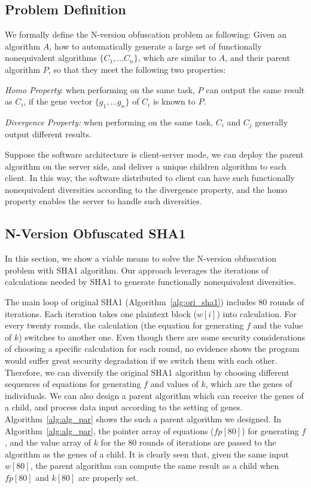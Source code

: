 \documentclass[10pt, conference]{IEEEtran}
\begin{document}
\subsection{Problem Definition}
We formally define the N-version obfuscation problem as following: Given an algorithm $A$, how to automatically generate a large set of functionally nonequivalent algorithms $\{C_1,...C_n\}$, which are similar to $A$, and their parent algorithm $P$, so that they meet the following two properties:

\textit{Homo Property}: when performing on the same task, $P$ can output the same result as $C_i$, if the gene vector $\{g_1,...g_n\}$ of $C_i$ is known to $P$.  

\textit{Divergence Property:} when performing on the same task, $C_i$ and $C_j$ generally output different results. 

Suppose the software architecture is client-server mode, we can deploy the parent algorithm on the server side, and deliver a unique children algorithm to each client.  In this way, the software distributed to client can have such functionally nonequivalent diversities according to the divergence property, and the homo property enables the server to handle such diversities.

\subsection{N-Version Obfuscated SHA1}

In this section, we show a viable means to solve the N-version obfuscation problem with SHA1 algorithm.  Our approach leverages the iterations of calculations needed by SHA1 to generate functionally nonequivalent diversities.

The main loop of original SHA1 (Algorithm~\ref{alg:ori_sha1}) includes 80 rounds of iterations.  Each iteration takes one plaintext block ($w[i]$) into calculation.  For every twenty rounds, the calculation (the equation for generating $f$ and the value of $k$) switches to another one.  Even though there are some security considerations of choosing a specific calculation for each round, no evidence shows the program would suffer great security degradation if we switch them with each other.  Therefore, we can diversify the original SHA1 algorithm by choosing different sequences of equations for generating $f$ and values of $k$, which are the genes of individuals.  We can also design a parent algorithm which can receive the genes of a child, and process data input according to the setting of genes.  Algorithm~\ref{alg:alg_par} shows the such a parent algorithm we designed.  In Algorithm~\ref{alg:alg_par}, the pointer array of equations ($fp[80]$) for generating $f$, and the value array of $k$ for the 80 rounds of iterations are passed to the algorithm as the genes of a child.  It is clearly seen that, given the same input $w[80]$, the parent algorithm can compute the same result as a child when $fp[80]$ and $k[80]$ are properly set.
\end{document}
